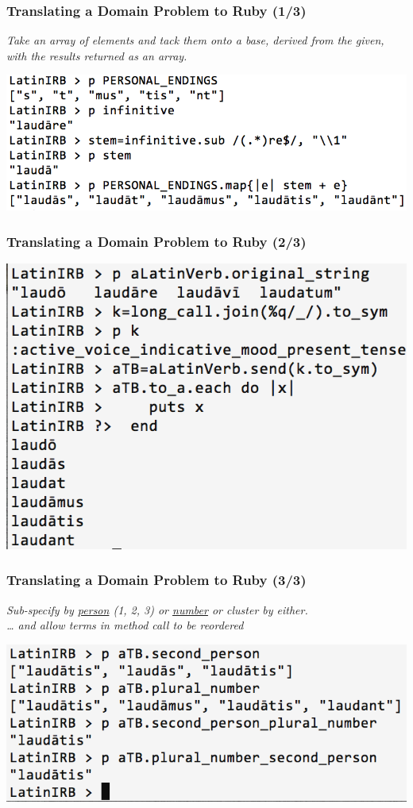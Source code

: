 \documentclass[slidestop,compress,mathserif]{beamer}
\begin{document}
\begin{frame}
	\frametitle{Translating a Domain Problem to Ruby (1/3)}
	\emph{Take an array of elements and tack them onto a base, derived from the
    given, with the results returned as an array.
}	\begin{center}
		\includegraphics[scale=0.38]{img/conj_how.png}
	\end{center}
\end{frame}

\begin{frame}
	\frametitle{Translating a Domain Problem to Ruby (2/3)}
	\includegraphics[scale=0.39]{img/conj_how_3b.png}
\end{frame}


\begin{frame}
	\frametitle{Translating a Domain Problem to Ruby (3/3)}
	\emph{
		Sub-specify by \underline{person} (1, 2, 3) or \underline{number} or
    cluster by either. \\
		\pause
		{\ldots} and allow terms in method call to be reordered
  }
	\vskip 0.5cm
	\begin{center}
		\includegraphics[scale=0.38]{img/conj_subspec.png}
	\end{center}
\end{frame}
\end{document}
